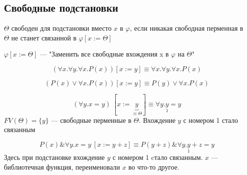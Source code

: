 \documentclass[oneside]{book}
\begin{document}
\subsection{Свободные подстановки}
\label{sec:orga693413}
\begin{definition}
	\(\Theta\) свободен для подстановки вместо \(x\) в \(\varphi\), если никакая свободная перменная в \(\Theta\) не станет связанной в \(\varphi[x := \Theta]\)
\end{definition}
\begin{definition}
	\(\varphi[x := \Theta]\) --- "Заменить все свободные вхождения x в \(\varphi\) на \(\Theta\)"
\end{definition}
\begin{examp}
	\[ (\forall x. \forall y. \forall x. P(x))[x := y] \equiv \forall x. \forall y. \forall x. P(x) \]
\end{examp}
\begin{examp}
	\[ (P(x) \vee \forall x. P(x))[x := y] \equiv P(y) \vee \forall x. P(x) \]
\end{examp}
\begin{examp}
	\[ (\forall y. x = y)\ [x := \underbrace{y}_{\equiv \Theta}] \equiv \forall y. \underset{1}{y} = y\]
	\(FV(\Theta) = \{y\}\) --- свободные перменные в \(\Theta\). Вхождение \(y\) с номером 1 стало связанным
\end{examp}
\begin{examp}
	\[ P(x) \& \forall y. x = y\ [x := y + z] \equiv P(y + z) \& \forall y. \underset{1}{y} + z = y \]
	Здесь при подстановке вхождение \(y\) с номером 1 cтало связанным. \(x\) --- библиотечная функция, переименовали \(x\) во что-то другое.
\end{examp}
\end{document}
